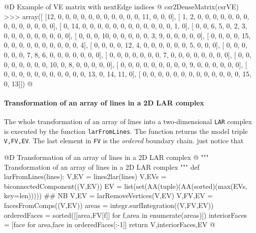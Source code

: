 \documentclass[11pt,oneside]{article}    %
\begin{document}
@D Example of VE matrix with nextEdge indices @{
csr2DenseMatrix(csrVE)
>>> array([
    [12,  0,  0,  0,  0,  0,  0,  0,  0,  0,  0,  0, 11,  0,  0,  0], 
    [ 1,  2,  0,  0,  0,  0,  0,  0,  0,  0,  0,  0,  0,  0,  0,  0], 
    [ 0, 14,  0,  0,  0,  0,  0,  0,  0,  0,  0,  0,  0,  0,  1,  0], 
    [ 0,  0,  6,  5,  0,  2,  3,  0,  0,  0,  0,  0,  0,  0,  0,  0], 
    [ 0,  0,  0, 10,  0,  0,  0,  0,  0,  3,  9,  0,  0,  0,  0,  0], 
    [ 0,  0,  0,  0, 15,  0,  0,  0,  0,  0,  0,  0,  0,  0,  0,  4], 
    [ 0,  0,  0,  0, 12,  4,  0,  0,  0,  0,  0,  0,  5,  0,  0,  0], 
    [ 0,  0,  0,  0,  0,  0,  7,  8,  6,  0,  0,  0,  0,  0,  0,  0], 
    [ 0,  0,  0,  0,  0,  0,  0,  7,  0,  0,  0,  0,  0,  0,  0,  0], 
    [ 0,  0,  0,  0,  0,  0,  0,  0, 10,  0,  8,  0,  0,  0,  0,  0], 
    [ 0,  0,  0,  0,  0,  0,  0,  0,  0,  9,  0,  0,  0,  0,  0,  0], 
    [ 0,  0,  0,  0,  0,  0,  0,  0,  0,  0,  0, 13,  0, 14, 11,  0], 
    [ 0,  0,  0,  0,  0,  0,  0,  0,  0,  0,  0,  0,  0, 15,  0, 13]])
@}



\paragraph{Transformation of an array of lines in a 2D LAR complex}

The whole transformation of an array of lines into a two-dimensional \texttt{LAR} complex is executed by the function \texttt{larFromLines}. The function returns the model triple \texttt{V,FV,EV}. The last element in \texttt{FV} is the \emph{ordered} boundary chain. just notice that 


@D Transformation of an array of lines in a 2D LAR complex @{
""" Transformation of an array of lines in a 2D LAR complex """
def larFromLines(lines):
    V,EV = lines2lar(lines)
    V,EVs = biconnectedComponent((V,EV))
    EV = list(set(AA(tuple)(AA(sorted)(max(EVs, key=len)))))  ## NB
    V,EV = larRemoveVertices(V,EV)
    V,FV,EV = facesFromComps((V,EV))
    areas = integr.surfIntegration((V,FV,EV))
    orderedFaces = sorted([[area,FV[f]] for f,area in enumerate(areas)])
    interiorFaces = [face for area,face in orderedFaces[:-1]]
    return V,interiorFaces,EV
@}
\end{document}
